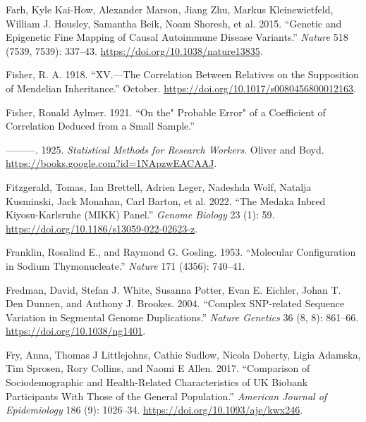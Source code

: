 \documentclass[
]{book}
\newlength{\cslhangindent}
\newlength{\cslentryspacingunit} %
\newenvironment{CSLReferences}[2] %
 {%
  \setlength{\parindent}{0pt}
  \ifodd #1
  \let\oldpar\par
  \def\par{\hangindent=\cslhangindent\oldpar}
  \fi
  \setlength{\parskip}{#2\cslentryspacingunit}
 }%
 {}
\begin{document}
\begin{CSLReferences}{1}{0}
\leavevmode{}%
Farh, Kyle Kai-How, Alexander Marson, Jiang Zhu, Markus Kleinewietfeld, William J. Housley, Samantha Beik, Noam Shoresh, et al. 2015. {``Genetic and Epigenetic Fine Mapping of Causal Autoimmune Disease Variants.''} \emph{Nature} 518 (7539, 7539): 337--43. \url{https://doi.org/10.1038/nature13835}.

\leavevmode{}%
Fisher, R. A. 1918. {``{XV}.---{The Correlation} Between {Relatives} on the {Supposition} of {Mendelian Inheritance}.''} October. \url{https://doi.org/10.1017/s0080456800012163}.

\leavevmode{}%
Fisher, Ronald Aylmer. 1921. {``On the{"} {Probable Error}{"} of a {Coefficient} of {Correlation Deduced} from a {Small Sample}.''}

\leavevmode{}%
---------. 1925. \emph{Statistical {Methods} for {Research Workers}}. {Oliver and Boyd}. \url{https://books.google.com?id=1NApzwEACAAJ}.

\leavevmode{}%
Fitzgerald, Tomas, Ian Brettell, Adrien Leger, Nadeshda Wolf, Natalja Kusminski, Jack Monahan, Carl Barton, et al. 2022. {``The {Medaka Inbred Kiyosu-Karlsruhe} ({MIKK}) Panel.''} \emph{Genome Biology} 23 (1): 59. \url{https://doi.org/10.1186/s13059-022-02623-z}.

\leavevmode{}%
Franklin, Rosalind E., and Raymond G. Gosling. 1953. {``Molecular Configuration in Sodium Thymonucleate.''} \emph{Nature} 171 (4356): 740--41.

\leavevmode{}%
Fredman, David, Stefan J. White, Susanna Potter, Evan E. Eichler, Johan T. Den Dunnen, and Anthony J. Brookes. 2004. {``Complex {SNP-related} Sequence Variation in Segmental Genome Duplications.''} \emph{Nature Genetics} 36 (8, 8): 861--66. \url{https://doi.org/10.1038/ng1401}.

\leavevmode{}%
Fry, Anna, Thomas J Littlejohns, Cathie Sudlow, Nicola Doherty, Ligia Adamska, Tim Sprosen, Rory Collins, and Naomi E Allen. 2017. {``Comparison of {Sociodemographic} and {Health-Related Characteristics} of {UK Biobank Participants With Those} of the {General Population}.''} \emph{American Journal of Epidemiology} 186 (9): 1026--34. \url{https://doi.org/10.1093/aje/kwx246}.


\end{CSLReferences}
\end{document}
